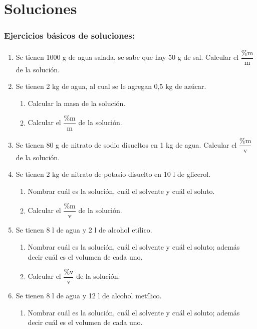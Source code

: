 \section{Soluciones}

\subsubsection*{Ejercicios básicos de soluciones:}

\begin{enumerate}
\item Se tienen 1000 g de agua salada, se sabe que hay 50 g de sal. Calcular el $\dfrac{\%\text{m}}{\text{m}}$ de la solución.


\item Se tienen 2 kg de agua, al cual se le agregan 0,5 kg de azúcar.
\begin{enumerate}
    \item Calcular la masa de la solución.
    \item Calcular el $\dfrac{\%\text{m}}{\text{m}}$ de la solución. 
\end{enumerate}


\item Se tienen 80 g de nitrato de sodio disueltos en 1 kg de agua. Calcular el $\dfrac{\%\text{m}}{\text{v}}$ de la solución.


\item Se tienen 2 kg de nitrato de potasio disuelto en 10 l de glicerol. 
\begin{enumerate}
    \item Nombrar cuál es la solución, cuál el solvente y cuál el soluto.

    \item Calcular el $\dfrac{\%\text{m}}{\text{v}}$ de la solución.
\end{enumerate}


\item Se tienen 8 l de agua y 2 l de alcohol etílico. 
\begin{enumerate}
    \item Nombrar cuál es la solución, cuál el solvente y cuál el soluto; además decir cuál es el volumen de cada uno.
    
    \item Calcular el $\dfrac{\%\text{v}}{\text{v}}$ de la solución.
\end{enumerate}


\item Se tienen 8 l de agua y 12 l de alcohol metílico. 
\begin{enumerate}
    \item Nombrar cuál es la solución, cuál el solvente y cuál el soluto; además decir cuál es el volumen de cada uno.


\end{enumerate}
\end{enumerate}
